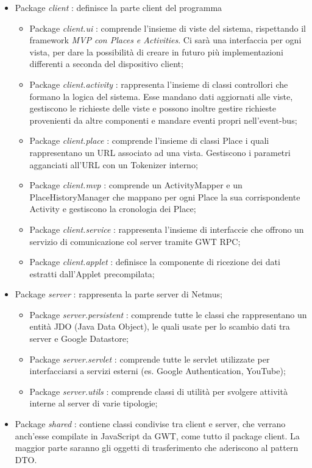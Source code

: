 \begin{itemize}
  \item Package \emph{client} : definisce la parte client del programma
  \begin {itemize}
    \item Package \emph{client.ui} : comprende l'insieme di viste del sistema,
    rispettando il framework \emph{MVP con Places e Activities}. Ci sar\`a una
    interfaccia per ogni vista, per dare la possibilit\`a di creare in futuro
    pi\`u implementazioni differenti a seconda del dispositivo client;
    \item Package \emph{client.activity} : rappresenta l'insieme di classi
    controllori che formano la logica del sistema. Esse mandano dati aggiornati alle
    viste, gestiscono le richieste delle viste e possono inoltre gestire
    richieste provenienti da altre componenti e mandare eventi propri nell'event-bus;
    \item Package \emph{client.place} : comprende l'insieme di classi Place i
    quali rappresentano un URL associato ad una vista. Gestiscono i parametri
    agganciati all'URL con un Tokenizer interno;
    \item Package \emph{client.mvp} : comprende un ActivityMapper e
    un PlaceHistoryManager che mappano per ogni Place la sua corrispondente
    Activity e gestiscono la cronologia dei Place;
    \item Package \emph{client.service} : rappresenta l'insieme di interfaccie
    che offrono un servizio di comunicazione col server tramite GWT RPC;
    \item Package \emph{client.applet} : definisce la componente di
    ricezione dei dati estratti dall'Applet precompilata;
  \end {itemize}
  \item Package \emph{server} : rappresenta la parte server di Netmus;
  \begin{itemize}
    \item Package \emph{server.persistent} : comprende tutte le classi che
    rappresentano un entit\`a JDO (Java Data Object), le quali usate per lo scambio dati tra
    server e Google Datastore;
    \item Package \emph{server.servlet} : comprende tutte le servlet utilizzate
    per interfacciarsi a servizi esterni (es. Google Authentication, YouTube);
    \item Package \emph{server.utils} : comprende classi di utilit\`a per
    svolgere attivit\`a interne al server di varie tipologie;
  \end{itemize}
  \item Package \emph{shared} :  contiene classi condivise tra client e server,
  che verrano anch'esse compilate in JavaScript da GWT, come tutto il package
  client. La maggior parte saranno gli oggetti di trasferimento che
  aderiscono al pattern DTO.
\end{itemize}

